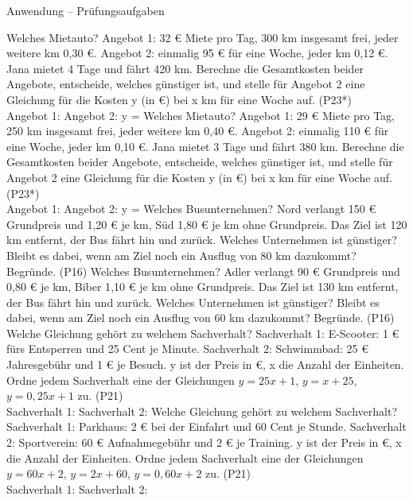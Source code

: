 \begin{aufgabe}{Anwendung – Prüfungsaufgaben}
\begin{teile}
\steil Welches Mietauto? Angebot 1: 32 € Miete pro Tag, 300 km insgesamt frei, jeder weitere km 0{,}30 €. Angebot 2: einmalig 95 € für eine Woche, jeder km 0{,}12 €. Jana mietet 4 Tage und fährt 420 km. Berechne die Gesamtkosten beider Angebote, entscheide, welches günstiger ist, und stelle für Angebot 2 eine Gleichung für die Kosten y (in €) bei x km für eine Woche auf. \hfill (P23*) \\ Angebot 1: \leerfeld[€] \quad Angebot 2: \leerfeld[€] \quad y = \leerfeld
\steil Welches Mietauto? Angebot 1: 29 € Miete pro Tag, 250 km insgesamt frei, jeder weitere km 0{,}40 €. Angebot 2: einmalig 110 € für eine Woche, jeder km 0{,}10 €. Jana mietet 3 Tage und fährt 380 km. Berechne die Gesamtkosten beider Angebote, entscheide, welches günstiger ist, und stelle für Angebot 2 eine Gleichung für die Kosten y (in €) bei x km für eine Woche auf. \hfill (P23*) \\ Angebot 1: \leerfeld[€] \quad Angebot 2: \leerfeld[€] \quad y = \leerfeld
\teil Welches Busunternehmen? Nord verlangt 150 € Grundpreis und 1{,}20 € je km, Süd 1{,}80 € je km ohne Grundpreis. Das Ziel ist 120 km entfernt, der Bus fährt hin und zurück. Welches Unternehmen ist günstiger? Bleibt es dabei, wenn am Ziel noch ein Ausflug von 80 km dazukommt? Begründe. \hfill (P16)
\teil Welches Busunternehmen? Adler verlangt 90 € Grundpreis und 0{,}80 € je km, Biber 1{,}10 € je km ohne Grundpreis. Das Ziel ist 130 km entfernt, der Bus fährt hin und zurück. Welches Unternehmen ist günstiger? Bleibt es dabei, wenn am Ziel noch ein Ausflug von 60 km dazukommt? Begründe. \hfill (P16)
\teil Welche Gleichung gehört zu welchem Sachverhalt? Sachverhalt 1: E-Scooter: 1 € fürs Entsperren und 25 Cent je Minute. Sachverhalt 2: Schwimmbad: 25 € Jahresgebühr und 1 € je Besuch. y ist der Preis in €, x die Anzahl der Einheiten. Ordne jedem Sachverhalt eine der Gleichungen $y = 25x + 1$, $y = x + 25$, $y = 0{,}25x + 1$ zu. \hfill (P21) \\ Sachverhalt 1: \leerfeld \quad Sachverhalt 2: \leerfeld
\teil Welche Gleichung gehört zu welchem Sachverhalt? Sachverhalt 1: Parkhaus: 2 € bei der Einfahrt und 60 Cent je Stunde. Sachverhalt 2: Sportverein: 60 € Aufnahmegebühr und 2 € je Training. y ist der Preis in €, x die Anzahl der Einheiten. Ordne jedem Sachverhalt eine der Gleichungen $y = 60x + 2$, $y = 2x + 60$, $y = 0{,}60x + 2$ zu. \hfill (P21) \\ Sachverhalt 1: \leerfeld \quad Sachverhalt 2: \leerfeld

\end{teile}
\end{aufgabe}
